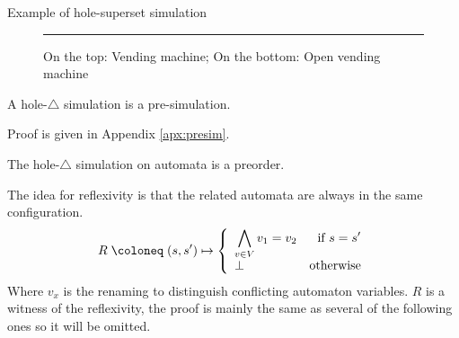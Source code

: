 \documentclass{article}
\begin{document}
\begin{exi}{Example of hole-superset simulation}
\begin{figure}
\centering

\hrule

\caption{On the top: Vending machine; On the bottom: Open vending machine}
\label{fig:ovm}
\end{figure}
\end{exi}
\begin{thm} A hole-\(\triangle\) simulation is a pre-simulation. \end{thm}
Proof is given in Appendix \ref{apx:presim}.
\begin{thm} The hole-\(\triangle\) simulation on automata is a preorder. \end{thm}
The idea for reflexivity is that the related automata are always in the same configuration.
\[ R \defobject \mpar{s, s'} \mapsto \choice{\bigwedge_{v \in V} v_1 = v_2 & \text{if } s = s'\\ \bot & \text{otherwise}} \]
Where \(v_x\) is the renaming to distinguish conflicting automaton variables.
\(R\) is a witness of the reflexivity, the proof is mainly the same as several of the following ones so it will be omitted.
\end{document}
